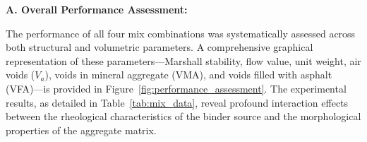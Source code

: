 \documentclass[12pt,a4paper]{article}
\begin{document}
\begin{table}[htbp]
    \centering
    \caption{Comparative Marshall properties of the four bituminous mix variants evaluated at 5.0\% OBC.}
    \label{tab:mix_data}
\end{table}

\textbf{A. Overall Performance Assessment:}

The performance of all four mix combinations was systematically assessed across both structural and volumetric parameters. A comprehensive graphical representation of these parameters---Marshall stability, flow value, unit weight, air voids ($V_a$), voids in mineral aggregate (VMA), and voids filled with asphalt (VFA)---is provided in Figure~\ref{fig:performance_assessment}. The experimental results, as detailed in Table~\ref{tab:mix_data}, reveal profound interaction effects between the rheological characteristics of the binder source and the morphological properties of the aggregate matrix.
\end{document}
